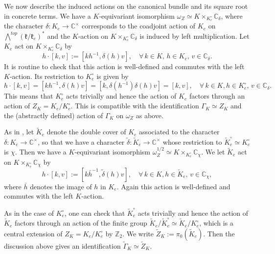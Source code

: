 \documentclass[11pt, a4paper]{amsart}
\newcommand{\C}{\mathbb{C}}
\newcommand{\Z}{\mathbb{Z}}
\newcommand{\fk}{\mathfrak{k}}
\newcommand{\tGamma}{\widetilde{\Gamma}}
\newcommand{\smallhalf}{{\scriptscriptstyle 1/2}}
\newcommand{\cm}{\C^\times}
\theoremstyle{definition}
\numberwithin{equation}{section}
\begin{document}
We now describe the induced actions on the canonical bundle and its square root in concrete terms. We have a $K$-equivariant isomorphism $\omega_Z \simeq K \times_{K_e^\circ} \C_\delta$, where the character $\delta: K_e \to \cm$ corresponds to the coadjoint action of $K_e$ on $\bigwedge^{top} (\fk/\fk_e)^*$ and the $K$-action on $K \times_{K_e^\circ} \C_\delta$ is induced by left multiplication. Let $K_e$ act on $K \times_{K_e^\circ} \C_\delta$ by
	\[ h \cdot [k, v] := [k h^{-1}, \delta(h) v], \quad \forall\, k \in K, \, h \in K_e, \, v \in \C_\delta. \]
It is routine to check that this action is well-defined and commutes with the left $K$-action. Its restriction to $K_e^\circ$ is given by
	\[ h \cdot [k, v] = [k h^{-1}, \delta(h) v] = [k, \delta(h^{-1}) \delta(h) v] = [k, v], \quad \forall\, k \in K, h \in K_e^\circ, \, v \in \C_\delta. \]
This means that $K_e^\circ$ acts trivially and hence the action of $K_e$ factors through an action of $Z_K = K_e / K_e^\circ$. This is compatible with the identification $\Gamma_K \simeq Z_K$ and the (abstractly defined) action of $\Gamma_K$ on $\omega_Z$ as above.

As in , let $\widetilde{K}_e$ denote the double cover of $K_e$ associated to the character $\delta: K_e \to \cm$, so that we have a character $\tilde{\delta}: \widetilde{K}_e \to \cm$ whose restriction to $\widetilde{K}_e^\circ \simeq K_e^\circ$ is $\chi$.
Then we have a $K$-equivariant isomorphism $\omega_Z^{\smallhalf} \simeq K \times_{K_e^\circ} \C_\chi$. 
We let $\widetilde{K}_e$ act on $K \times_{K_e^\circ} \C_\chi$ by
	\[ h \cdot [k, v] := [k \bar{h}^{-1}, \tilde{\delta}(h) v], \quad \forall\, k \in K, h \in \widetilde{K}_e, \, v \in \C_\chi, \]
where $\bar{h}$ denotes the image of $h$ in $K_e$. Again this action is well-defined and commutes with the left $K$-action. 

As in the case of $K_e^\circ$, one can check that $\widetilde{K}_e^\circ$ acts trivially and hence the action of $\widetilde{K}_e$ factors through an action of the finite group $\widetilde{K}_e / \widetilde{K}_e^\circ \simeq \widetilde{K}_e/K_e^\circ$, which is a central extension of $Z_K = K_e / K_e^\circ$ by $\Z_2$. We write $\widetilde{Z}_K := \pi_0(\widetilde{K}_e)$. Then the discussion above gives an identification $\tGamma_K \simeq \widetilde{Z}_K$.
\end{document}

